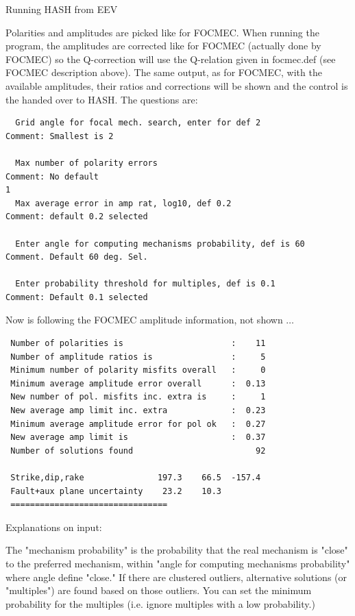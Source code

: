Running HASH from EEV

Polarities and amplitudes are picked like for FOCMEC. When running the program, the amplitudes are corrected like for FOCMEC (actually done by FOCMEC) so the Q-correction will use the Q-relation given in focmec.def (see FOCMEC description above). The same output, as for FOCMEC, with the available amplitudes, their ratios and corrections will be shown and the control is the handed over to HASH. The questions are:

\begin{verbatim}
  Grid angle for focal mech. search, enter for def 2            Comment: Smallest is 2

  Max number of polarity errors                                 Comment: No default
1
  Max average error in amp rat, log10, def 0.2                  Comment: default 0.2 selected

  Enter angle for computing mechanisms probability, def is 60   Comment. Default 60 deg. Sel.

  Enter probability threshold for multiples, def is 0.1         Comment: Default 0.1 selected
\end{verbatim}

Now is following the FOCMEC amplitude information, not shown $\ldots$

\begin{verbatim}
 Number of polarities is                      :    11
 Number of amplitude ratios is                :     5
 Minimum number of polarity misfits overall   :     0     
 Minimum average amplitude error overall      :  0.13
 New number of pol. misfits inc. extra is     :     1
 New average amp limit inc. extra             :  0.23
 Minimum average amplitude error for pol ok   :  0.27
 New average amp limit is                     :  0.37
 Number of solutions found                         92

 Strike,dip,rake               197.3    66.5  -157.4
 Fault+aux plane uncertainty    23.2    10.3
 ================================
\end{verbatim}

Explanations on input:

The "mechanism probability" is the probability that the real mechanism 
is "close" to the preferred mechanism, within "angle for computing 
mechanisms probability" where angle define "close." If there are 
clustered outliers, alternative solutions (or "multiples") are found 
based on those outliers. You can set the minimum probability for the 
multiples (i.e. ignore multiples with a low probability.)

